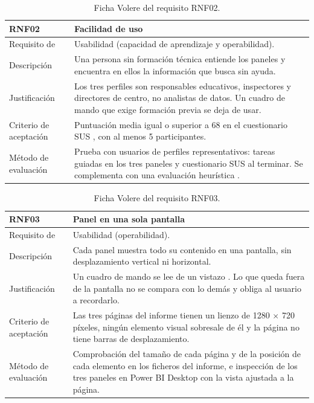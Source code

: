 \documentclass[12pt, a4paper, oneside]{report}
\begin{document}
\begin{table}[!htbp]
\centering
\small
{}\renewcommand{\arraystretch}{1.0}\setlength{\defaultaddspace}{3pt}
\begin{tabularx}{\textwidth}{@{} >{\raggedright\arraybackslash}p{3.4cm} X @{}}
\toprule
\textbf{RNF02} & \textbf{Facilidad de uso} \\ \midrule
Requisito de & Usabilidad (capacidad de aprendizaje y operabilidad). \\ \addlinespace
Descripción & Una persona sin formación técnica entiende los paneles y encuentra en ellos la información que busca sin ayuda. \\ \addlinespace
Justificación & Los tres perfiles son responsables educativos, inspectores y directores de centro, no analistas de datos. Un cuadro de mando que exige formación previa se deja de usar. \\ \addlinespace
Criterio de aceptación & Puntuación media igual o superior a 68 en el cuestionario SUS \cite{brooke1996sus}, con al menos 5 participantes. \\ \addlinespace
Método de evaluación & Prueba con usuarios de perfiles representativos: tareas guiadas en los tres paneles y cuestionario SUS al terminar. Se complementa con una evaluación heurística \cite{nielsen1993usability}. \\ \bottomrule
\end{tabularx}
\caption{Ficha Volere del requisito RNF02.}
\label{tab:rnf02}
\end{table}

\begin{table}[!htbp]
\centering
\small
{}\renewcommand{\arraystretch}{1.0}\setlength{\defaultaddspace}{3pt}
\begin{tabularx}{\textwidth}{@{} >{\raggedright\arraybackslash}p{3.4cm} X @{}}
\toprule
\textbf{RNF03} & \textbf{Panel en una sola pantalla} \\ \midrule
Requisito de & Usabilidad (operabilidad). \\ \addlinespace
Descripción & Cada panel muestra todo su contenido en una pantalla, sin desplazamiento vertical ni horizontal. \\ \addlinespace
Justificación & Un cuadro de mando se lee de un vistazo \cite{few2006information}. Lo que queda fuera de la pantalla no se compara con lo demás y obliga al usuario a recordarlo. \\ \addlinespace
Criterio de aceptación & Las tres páginas del informe tienen un lienzo de 1280 $\times$ 720 píxeles, ningún elemento visual sobresale de él y la página no tiene barras de desplazamiento. \\ \addlinespace
Método de evaluación & Comprobación del tamaño de cada página y de la posición de cada elemento en los ficheros del informe, e inspección de los tres paneles en Power BI Desktop con la vista ajustada a la página. \\ \bottomrule
\end{tabularx}
\caption{Ficha Volere del requisito RNF03.}
\label{tab:rnf03}
\end{table}
\end{document}
